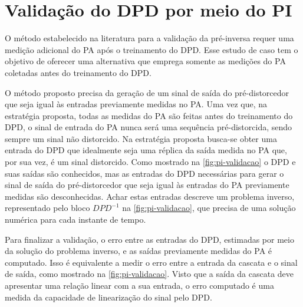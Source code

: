 \section{Validação do DPD por meio do PI} \label{sec:estudoii-dpd}
O método estabelecido na literatura para a validação da pré-inversa requer uma medição adicional do PA após o treinamento do DPD. Esse estudo de caso tem o objetivo de oferecer uma alternativa que emprega somente as medições do PA coletadas antes do treinamento do DPD.

O método proposto precisa da geração de um sinal de saída do pré-distorcedor que seja igual às entradas previamente medidas no PA. Uma vez que, na estratégia proposta, todas as medidas do PA são feitas antes do treinamento do DPD, o sinal de entrada do PA nunca será uma sequência pré-distorcida, sendo sempre um sinal não distorcido. Na estratégia proposta busca-se obter uma entrada do DPD que idealmente seja uma réplica da saída medida no PA que, por sua vez, é um sinal distorcido. Como mostrado na \autoref{fig:pi-validacao} o DPD e suas saídas são conhecidos, mas as entradas do DPD necessárias para gerar o sinal de saída do pré-distorcedor que seja igual às entradas do PA previamente medidas são desconhecidas. Achar estas entradas descreve um problema inverso, representado pelo bloco $DPD^{-1}$ na \autoref{fig:pi-validacao}, que precisa de uma solução numérica para cada instante de tempo.

Para finalizar a validação, o erro entre as entradas do DPD, estimadas por meio da solução do problema inverso, e as saídas previamente medidas do PA é computado. Isso é equivalente a medir o erro entre a entrada da cascata e o sinal de saída, como mostrado na \autoref{fig:pi-validacao}. Visto que a saída da cascata deve apresentar uma relação linear com a sua entrada, o erro computado é uma medida da capacidade de linearização do sinal pelo DPD.

